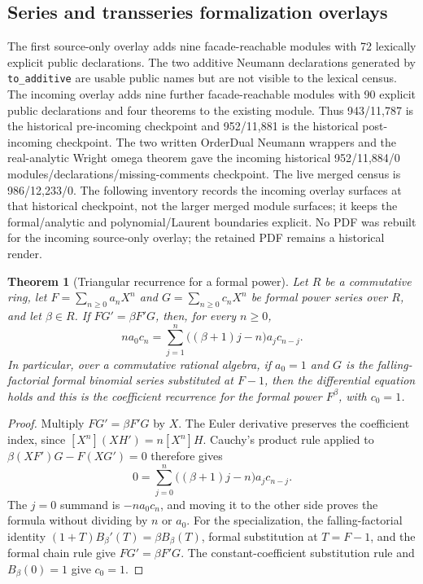 \documentclass[11pt,oneside]{article}
\newtheorem{theorem}{Theorem}[section]
\theoremstyle{definition}
\theoremstyle{remark}
\begin{document}
\subsection{Series and transseries formalization overlays}

The first source-only overlay adds nine facade-reachable modules with 72
lexically explicit public declarations.  The two additive Neumann declarations
generated by \texttt{to\_additive} are usable public names but are not visible to
the lexical census.  The incoming overlay adds nine further facade-reachable
modules with 90 explicit public declarations and four theorems to the existing
 module.  Thus 943/11,787 is the
historical pre-incoming checkpoint and 952/11,881 is the historical
post-incoming checkpoint.  The two written OrderDual Neumann wrappers and the
real-analytic Wright omega theorem gave the incoming historical
952/11,884/0 modules/declarations/missing-comments checkpoint.  The live
merged census is 986/12,233/0.  The following inventory records the incoming
overlay surfaces at that historical checkpoint, not the larger merged module
surfaces; it keeps the formal/analytic and polynomial/Laurent boundaries
explicit.  No PDF was rebuilt for the incoming
source-only overlay; the retained PDF remains a historical render.

\begin{theorem}[Triangular recurrence for a formal power]
\label{thm:formal-unit-series-power-recurrence}
Let \(R\) be a commutative ring, let
\(F=\sum_{n\geq0}a_nX^n\) and \(G=\sum_{n\geq0}c_nX^n\) be formal power
series over \(R\), and let \(\beta\in R\).  If
\(FG'=\beta F'G\), then, for every \(n\geq0\),
\[
 n a_0c_n=\sum_{j=1}^{n}\bigl((\beta+1)j-n\bigr)a_jc_{n-j}.
\]
In particular, over a commutative rational algebra, if \(a_0=1\) and
\(G\) is the falling-factorial formal binomial series substituted at \(F-1\),
then the differential equation holds and this is the coefficient recurrence
for the formal power \(F^\beta\), with \(c_0=1\).
\end{theorem}

\begin{proof}
Multiply \(FG'=\beta F'G\) by \(X\).  The Euler derivative preserves the
coefficient index, since \([X^n](XH')=n[X^n]H\).  Cauchy's product rule applied
to \(\beta(XF')G-F(XG')=0\) therefore gives
\[
 0=\sum_{j=0}^{n}\bigl((\beta+1)j-n\bigr)a_jc_{n-j}.
\]
The \(j=0\) summand is \(-na_0c_n\), and moving it to the other side proves
the formula without dividing by \(n\) or \(a_0\).  For the specialization,
the falling-factorial identity \((1+T)B_\beta'(T)=\beta B_\beta(T)\), formal
substitution at \(T=F-1\), and the formal chain rule give \(FG'=\beta F'G\).
The constant-coefficient substitution rule and \(B_\beta(0)=1\) give
\(c_0=1\).
\end{proof}
\end{document}
